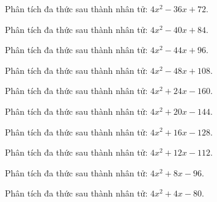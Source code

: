 \begin{bt}
	Phân tích đa thức sau thành nhân tử: $4 x^2 - 36 x + 72$.
\end{bt}
\begin{bt}
	Phân tích đa thức sau thành nhân tử: $4 x^2 - 40 x + 84$.
\end{bt}
\begin{bt}
	Phân tích đa thức sau thành nhân tử: $4 x^2 - 44 x + 96$.
\end{bt}
\begin{bt}
	Phân tích đa thức sau thành nhân tử: $4 x^2 - 48 x + 108$.
\end{bt}
\begin{bt}
	Phân tích đa thức sau thành nhân tử: $4 x^2 + 24 x - 160$.
\end{bt}
\begin{bt}
	Phân tích đa thức sau thành nhân tử: $4 x^2 + 20 x - 144$.
\end{bt}
\begin{bt}
	Phân tích đa thức sau thành nhân tử: $4 x^2 + 16 x - 128$.
\end{bt}
\begin{bt}
	Phân tích đa thức sau thành nhân tử: $4 x^2 + 12 x - 112$.
\end{bt}
\begin{bt}
	Phân tích đa thức sau thành nhân tử: $4 x^2 + 8 x - 96$.
\end{bt}
\begin{bt}
	Phân tích đa thức sau thành nhân tử: $4 x^2 + 4 x - 80$.
\end{bt}
